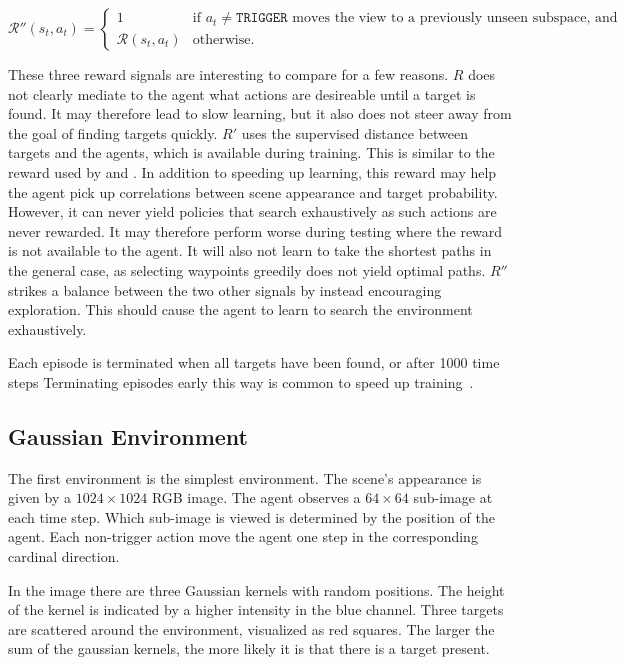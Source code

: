 \begin{equation*}
    \mathcal{R}''(s_t, a_t) =
    \begin{cases}
        1 & \text{if \(a_t \neq \mathtt{TRIGGER}\) moves the view to a previously unseen subspace, and} \\
        \mathcal{R}(s_t, a_t) & \text{otherwise}.
    \end{cases}
\end{equation*}

These three reward signals are interesting to compare for a few reasons.
\(R\) does not clearly mediate to the agent what actions are desireable until a target is found.
It may therefore lead to slow learning, but it also does not steer away from the goal of finding targets quickly.
\(R'\) uses the supervised distance between targets and the agents, which is available during training.
This is similar to the reward used by \cite{caicedo_active_2015} and \cite{ghesu_artificial_2016}.
In addition to speeding up learning, this reward may help the agent pick up correlations between scene appearance and target probability.
However, it can never yield policies that search exhaustively as such actions are never rewarded.
It may therefore perform worse during testing where the reward is not available to the agent.
It will also not learn to take the shortest paths in the general case, as selecting waypoints greedily does not yield optimal paths.
\(R''\) strikes a balance between the two other signals by instead encouraging exploration.
This should cause the agent to learn to search the environment exhaustively.

Each episode is terminated when all targets have been found, or after 1000 time steps
Terminating episodes early this way is common to speed up training~\cite{pardo_timelimits_2022}.

\subsection{Gaussian Environment}

The first environment is the simplest environment. 
The scene's appearance is given by a \(1024 \times 1024\) RGB image.
The agent observes a \(64 \times 64\) sub-image at each time step.
Which sub-image is viewed is determined by the position of the agent.
Each non-trigger action move the agent one step in the corresponding cardinal direction.

In the image there are three Gaussian kernels with random positions.
The height of the kernel is indicated by a higher intensity in the blue channel.
Three targets are scattered around the environment, visualized as red squares.
The larger the sum of the gaussian kernels, the more likely it is that there is a target present.

